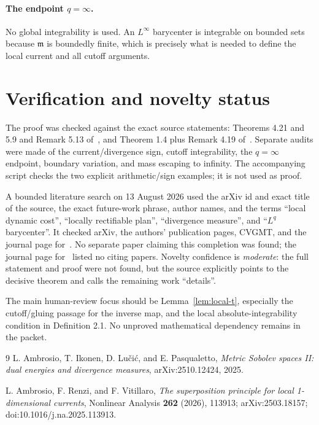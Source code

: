 \documentclass[11pt]{article}
\newcommand{\m}{\mathfrak m}
\begin{document}
\paragraph{The endpoint $q=\infty$.}
No global integrability is used.  An $L^\infty$ barycenter is integrable on
bounded sets because $\m$ is boundedly finite, which is precisely what is
needed to define the local current and all cutoff arguments.

\section{Verification and novelty status}

The proof was checked against the exact source statements: Theorems 4.21 and
5.9 and Remark 5.13 of~\cite{AIKP}, and Theorem 1.4 plus Remark 4.19
of~\cite{ARV}.  Separate audits were made of the current/divergence sign,
cutoff integrability, the $q=\infty$ endpoint, boundary variation, and mass
escaping to infinity.  The accompanying script checks the two explicit
arithmetic/sign examples; it is not used as proof.

A bounded literature search on 13 August 2026 used the arXiv id and exact
title of the source, the exact future-work phrase, author names, and the terms
``local dynamic cost'', ``locally rectifiable plan'', ``divergence measure'',
and ``$L^q$ barycenter''.  It checked arXiv, the authors' publication pages,
CVGMT, and the journal page for~\cite{ARV}.  No separate paper claiming this
completion was found; the journal page for~\cite{ARV} listed no citing papers.
Novelty confidence is \emph{moderate}: the full statement and proof were not
found, but the source explicitly points to the decisive theorem and calls the
remaining work ``details''.

The main human-review focus should be Lemma~\ref{lem:local-t}, especially the
cutoff/gluing passage for the inverse map, and the local absolute-integrability
condition in Definition 2.1.  No unproved mathematical dependency remains in
the packet.

\begin{thebibliography}{9}
L. Ambrosio, T. Ikonen, D. Lu\v{c}i\'c, and E. Pasqualetto,
\emph{Metric Sobolev spaces II: dual energies and divergence measures},
arXiv:2510.12424, 2025.

L. Ambrosio, F. Renzi, and F. Vitillaro,
\emph{The superposition principle for local 1-dimensional currents},
Nonlinear Analysis \textbf{262} (2026), 113913;
arXiv:2503.18157; doi:10.1016/j.na.2025.113913.
\end{thebibliography}
\end{document}
